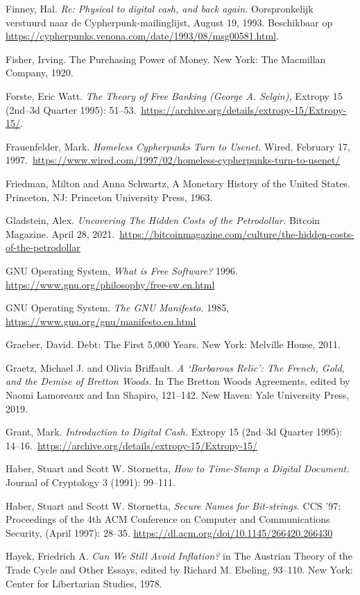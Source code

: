 \documentclass[
  a5paper,
  smalldemyvopaper,11pt,twoside,onecolumn,openright,extrafontsizes,
hidelinks]{memoir}
\begin{document}
{Finney, Hal. \emph{Re: Physical to digital cash, and back again.}
Oorspronkelijk verstuurd naar de Cypherpunk-mailinglijst, August 19,
1993. Beschikbaar op
\url{https://cypherpunks.venona.com/date/1993/08/msg00581.html}.

Fisher, Irving. The Purchasing Power of Money. New York: The Macmillan
Company, 1920.

Forste, Eric Watt. \emph{The Theory of Free Banking (George A. Selgin),}
Extropy 15 (2nd--3d Quarter 1995):
51--53.~\url{https://archive.org/details/extropy-15/Extropy-15/}.

Frauenfelder, Mark. \emph{Homeless Cypherpunks Turn to Usenet.} Wired.
February 17,
1997.~\url{https://www.wired.com/1997/02/homeless-cypherpunks-turn-to-usenet/}

Friedman, Milton and Anna Schwartz, A Monetary History of the United
States. Princeton, NJ: Princeton University Press, 1963.

Gladstein, Alex. \emph{Uncovering The Hidden Costs of the Petrodollar.}
Bitcoin Magazine. April 28,
2021.~\url{https://bitcoinmagazine.com/culture/the-hidden-costs-of-the-petrodollar}

GNU Operating System, \emph{What is Free Software?} 1996.
\url{https://www.gnu.org/philosophy/free-sw.en.html}

GNU Operating System. \emph{The GNU Manifesto.} 1985,
\url{https://www.gnu.org/gnu/manifesto.en.html}

Graeber, David. Debt: The First 5,000 Years. New York: Melville House,
2011.

Graetz, Michael J. and Olivia Briffault. \emph{A `Barbarous Relic': The
French, Gold, and the Demise of Bretton Woods.} In The Bretton Woods
Agreements, edited by Naomi Lamoreaux and Ian Shapiro, 121--142. New
Haven: Yale University Press, 2019.

Grant, Mark. \emph{Introduction to Digital Cash.} Extropy 15 (2nd--3d
Quarter 1995):
14--16.~\url{https://archive.org/details/extropy-15/Extropy-15/}

Haber, Stuart and Scott W. Stornetta, \emph{How to Time-Stamp a Digital
Document.} Journal of Cryptology 3 (1991): 99--111.

Haber, Stuart and Scott W. Stornetta, \emph{Secure Names for
Bit-strings.} CCS '97: Proceedings of the 4th ACM Conference on Computer
and Communications Security, (April 1997): 28--35.
\url{https://dl.acm.org/doi/10.1145/266420.266430}

Hayek, Friedrich A. \emph{Can We Still Avoid Inflation?} in The Austrian
Theory of the Trade Cycle and Other Essays, edited by Richard M.
Ebeling, 93--110. New York: Center for Libertarian Studies, 1978.

}
\end{document}

